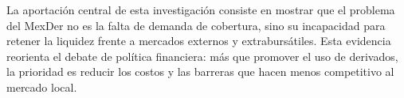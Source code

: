 La aportación central de esta investigación consiste en mostrar que el problema del MexDer no es la falta de demanda de cobertura, sino su incapacidad para retener la liquidez frente a mercados externos y extrabursátiles. Esta evidencia reorienta el debate de política financiera: más que promover el uso de derivados, la prioridad es reducir los costos y las barreras que hacen menos competitivo al mercado local.
